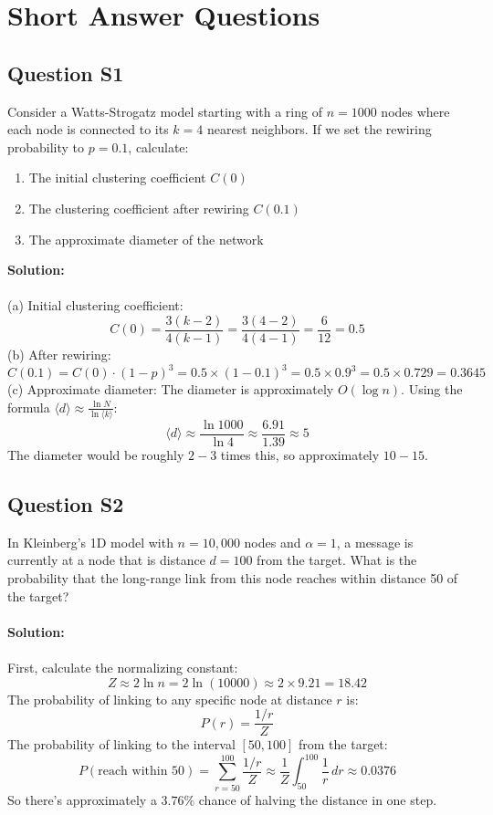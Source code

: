 \documentclass[11pt,a4paper]{article}
\theoremstyle{definition}
\begin{document}
\section{Short Answer Questions}
\subsection{Question S1}
Consider a Watts-Strogatz model starting with a ring of $n = 1000$ nodes where each node is connected to its $k = 4$ nearest neighbors. If we set the rewiring probability to $p = 0.1$, calculate:
\begin{enumerate}[label=(\alph*)]
\item The initial clustering coefficient $C(0)$
\item The clustering coefficient after rewiring $C(0.1)$
\item The approximate diameter of the network
\end{enumerate}
\textbf{Solution:}\\
\\
(a) Initial clustering coefficient:
$$
C(0) = \frac{3(k-2)}{4(k-1)} = \frac{3(4-2)}{4(4-1)} = \frac{6}{12}=0.5
$$
(b) After rewiring:
$$
C(0.1) = C(0)\cdot (1-p)^3 = 0.5\times (1-0.1)^3 = 0.5\times 0.9^3 = 0.5\times 0.729 = 0.3645
$$
(c) Approximate diameter:
The diameter is approximately $O(\log n)$. Using the formula $\langle d \rangle \approx \frac{\ln N}{\ln \langle k \rangle}$:
$$
\langle d\rangle\approx \frac{\ln 1000}{\ln 4}\approx \frac{6.91}{1.39}\approx 5
$$
The diameter would be roughly $2-3$ times this, so approximately $10-15$.
\subsection{Question S2}
In Kleinberg's 1D model with $n = 10,000$ nodes and $\alpha = 1$, a message is currently at a node that is distance $d = 100$ from the target. What is the probability that the long-range link from this node reaches within distance 50 of the target?\\
\\
\textbf{Solution:}\\
\\
First, calculate the normalizing constant:
$$
Z\approx 2\ln n = 2\ln (10000)\approx 2\times 9.21=18.42
$$
The probability of linking to any specific node at distance $r$ is:
$$
P(r) =\frac{1/r}{Z}
$$
The probability of linking to the interval $[50, 100]$ from the target:
$$
P(\text{reach within $50$}) = \sum_{r=50}^{100}\frac{1/r}{Z}\approx \frac{1}{Z}\int_{50}^{100}\frac{1}{r}\, dr \approx 0.0376
$$
So there's approximately a $3.76\%$ chance of halving the distance in one step.
\end{document}
